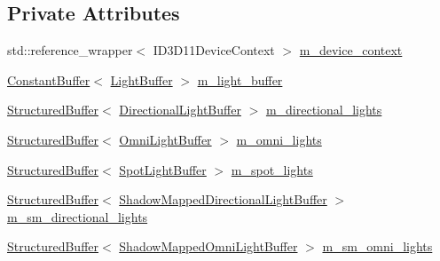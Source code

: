 \subsection*{Private Attributes}
\begin{DoxyCompactItemize}
\item 
std\+::reference\+\_\+wrapper$<$ I\+D3\+D11\+Device\+Context $>$ \mbox{\hyperlink{classmage_1_1rendering_1_1_l_buffer_pass_adccb16b406d2020a7608512cc0f9e6d0}{m\+\_\+device\+\_\+context}}
\item 
\mbox{\hyperlink{classmage_1_1rendering_1_1_constant_buffer}{Constant\+Buffer}}$<$ \mbox{\hyperlink{structmage_1_1rendering_1_1_light_buffer}{Light\+Buffer}} $>$ \mbox{\hyperlink{classmage_1_1rendering_1_1_l_buffer_pass_ab80d18b8193e90588afa5e992b5b1af8}{m\+\_\+light\+\_\+buffer}}
\item 
\mbox{\hyperlink{classmage_1_1rendering_1_1_structured_buffer}{Structured\+Buffer}}$<$ \mbox{\hyperlink{structmage_1_1rendering_1_1_directional_light_buffer}{Directional\+Light\+Buffer}} $>$ \mbox{\hyperlink{classmage_1_1rendering_1_1_l_buffer_pass_a46bc97b1576c1f1702d26c827785c343}{m\+\_\+directional\+\_\+lights}}
\item 
\mbox{\hyperlink{classmage_1_1rendering_1_1_structured_buffer}{Structured\+Buffer}}$<$ \mbox{\hyperlink{structmage_1_1rendering_1_1_omni_light_buffer}{Omni\+Light\+Buffer}} $>$ \mbox{\hyperlink{classmage_1_1rendering_1_1_l_buffer_pass_af7bc4d8ed4d667aa8e6375d6f243d900}{m\+\_\+omni\+\_\+lights}}
\item 
\mbox{\hyperlink{classmage_1_1rendering_1_1_structured_buffer}{Structured\+Buffer}}$<$ \mbox{\hyperlink{structmage_1_1rendering_1_1_spot_light_buffer}{Spot\+Light\+Buffer}} $>$ \mbox{\hyperlink{classmage_1_1rendering_1_1_l_buffer_pass_abc2a2704d99a2a5335d28f3039d600ca}{m\+\_\+spot\+\_\+lights}}
\item 
\mbox{\hyperlink{classmage_1_1rendering_1_1_structured_buffer}{Structured\+Buffer}}$<$ \mbox{\hyperlink{structmage_1_1rendering_1_1_shadow_mapped_directional_light_buffer}{Shadow\+Mapped\+Directional\+Light\+Buffer}} $>$ \mbox{\hyperlink{classmage_1_1rendering_1_1_l_buffer_pass_acbb9492defc1f8e040d95d28988d595f}{m\+\_\+sm\+\_\+directional\+\_\+lights}}
\item 
\mbox{\hyperlink{classmage_1_1rendering_1_1_structured_buffer}{Structured\+Buffer}}$<$ \mbox{\hyperlink{structmage_1_1rendering_1_1_shadow_mapped_omni_light_buffer}{Shadow\+Mapped\+Omni\+Light\+Buffer}} $>$ \mbox{\hyperlink{classmage_1_1rendering_1_1_l_buffer_pass_a3f32431790f55b3959713ae44c1847f9}{m\+\_\+sm\+\_\+omni\+\_\+lights}}

\end{DoxyCompactItemize}
